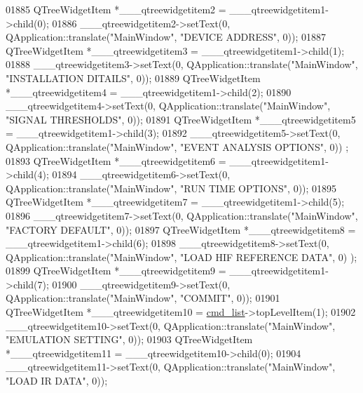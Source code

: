 \begin{DoxyCode}
01885         QTreeWidgetItem *\_\_\_qtreewidgetitem2 = \_\_\_qtreewidgetitem1->child(0);
01886         \_\_\_qtreewidgetitem2->setText(0, QApplication::translate(\textcolor{stringliteral}{"MainWindow"}, \textcolor{stringliteral}{"DEVICE ADDRESS"}, 0));
01887         QTreeWidgetItem *\_\_\_qtreewidgetitem3 = \_\_\_qtreewidgetitem1->child(1);
01888         \_\_\_qtreewidgetitem3->setText(0, QApplication::translate(\textcolor{stringliteral}{"MainWindow"}, \textcolor{stringliteral}{"INSTALLATION DITAILS"}, 0));
01889         QTreeWidgetItem *\_\_\_qtreewidgetitem4 = \_\_\_qtreewidgetitem1->child(2);
01890         \_\_\_qtreewidgetitem4->setText(0, QApplication::translate(\textcolor{stringliteral}{"MainWindow"}, \textcolor{stringliteral}{"SIGNAL THRESHOLDS"}, 0));
01891         QTreeWidgetItem *\_\_\_qtreewidgetitem5 = \_\_\_qtreewidgetitem1->child(3);
01892         \_\_\_qtreewidgetitem5->setText(0, QApplication::translate(\textcolor{stringliteral}{"MainWindow"}, \textcolor{stringliteral}{"EVENT ANALYSIS OPTIONS"}, 0))
      ;
01893         QTreeWidgetItem *\_\_\_qtreewidgetitem6 = \_\_\_qtreewidgetitem1->child(4);
01894         \_\_\_qtreewidgetitem6->setText(0, QApplication::translate(\textcolor{stringliteral}{"MainWindow"}, \textcolor{stringliteral}{"RUN TIME OPTIONS"}, 0));
01895         QTreeWidgetItem *\_\_\_qtreewidgetitem7 = \_\_\_qtreewidgetitem1->child(5);
01896         \_\_\_qtreewidgetitem7->setText(0, QApplication::translate(\textcolor{stringliteral}{"MainWindow"}, \textcolor{stringliteral}{"FACTORY DEFAULT"}, 0));
01897         QTreeWidgetItem *\_\_\_qtreewidgetitem8 = \_\_\_qtreewidgetitem1->child(6);
01898         \_\_\_qtreewidgetitem8->setText(0, QApplication::translate(\textcolor{stringliteral}{"MainWindow"}, \textcolor{stringliteral}{"LOAD HIF REFERENCE DATA"}, 0)
      );
01899         QTreeWidgetItem *\_\_\_qtreewidgetitem9 = \_\_\_qtreewidgetitem1->child(7);
01900         \_\_\_qtreewidgetitem9->setText(0, QApplication::translate(\textcolor{stringliteral}{"MainWindow"}, \textcolor{stringliteral}{"COMMIT"}, 0));
01901         QTreeWidgetItem *\_\_\_qtreewidgetitem10 = \hyperlink{a00027_aa66ece71395b435e915d384fb63bac1d}{cmd\_list}->topLevelItem(1);
01902         \_\_\_qtreewidgetitem10->setText(0, QApplication::translate(\textcolor{stringliteral}{"MainWindow"}, \textcolor{stringliteral}{"EMULATION SETTING"}, 0));
01903         QTreeWidgetItem *\_\_\_qtreewidgetitem11 = \_\_\_qtreewidgetitem10->child(0);
01904         \_\_\_qtreewidgetitem11->setText(0, QApplication::translate(\textcolor{stringliteral}{"MainWindow"}, \textcolor{stringliteral}{"LOAD IR DATA"}, 0));

\end{DoxyCode}
